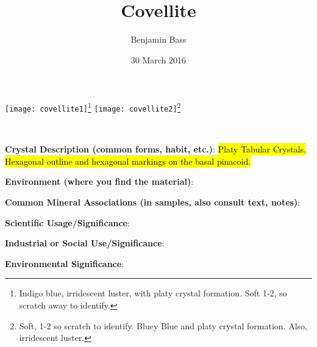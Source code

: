 \documentclass[10pt]{article}
\author{Benjamin Bass}
\date{30 March 2016}
\title{\vspace{-2.0cm}Covellite} %
\begin{document}
\maketitle


\begin{center}
  \texttt{[image: covellite1]}\footnote{Indigo blue, irridescent luster, with platy crystal formation. Soft 1-2, so scratch away to identify.}
  \texttt{[image: covellite2]}\footnote{Soft, 1-2 so scratch to identify. Bluey Blue and platy crystal formation. Also, irridescent luster.}
\end{center}



\
\
\
\
\
\
\
\
\
\

\begin{framed}
  \textbf{Crystal Description (common forms, habit, etc.)}: \hl{Platy Tabular Crystals. Hexagonal outline and hexagonal markings on the basal pinacoid.}
\end{framed}

\begin{framed}
  \textbf{Environment (where you find the material)}: 
\end{framed}

\begin{framed}
  \textbf{Common Mineral Associations (in samples, also consult text, notes)}: 
\end{framed}

\begin{framed}
  \textbf{Scientific Usage/Significance}: 
\end{framed}

\begin{framed}
  \textbf{Industrial or Social Use/Significance}: 
\end{framed}

\begin{framed}
  \textbf{Environmental Significance}: 
\end{framed}

\end{document}
